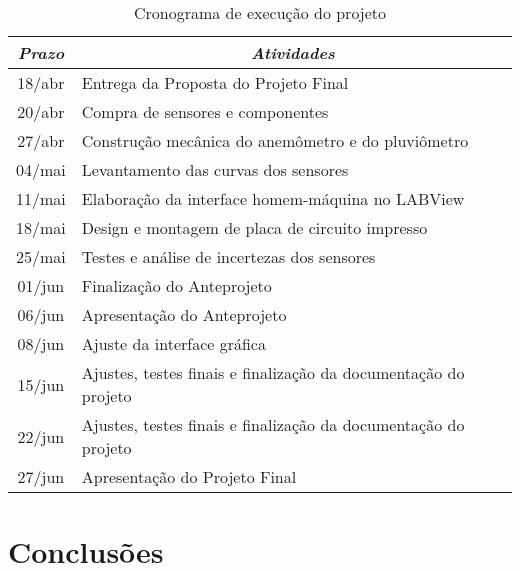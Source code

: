 \documentclass[12pt,a4paper]{instrumentacao}
\begin{document}
\begin{table}[H]
\centering
\caption{Cronograma de execução do projeto}
\label{tab:cronograma}
\begin{tabular}{|c|l|}
\hline
\textit{\textbf{Prazo}} & \multicolumn{1}{c|}{\textit{\textbf{Atividades}}}               \\ \hline
18/abr                  & Entrega da Proposta do Projeto Final                            \\ \hline
20/abr                  & Compra de sensores e componentes                                \\ \hline
27/abr                  & Construção mecânica do anemômetro e do pluviômetro              \\ \hline
04/mai                  & Levantamento das curvas dos sensores                            \\ \hline
11/mai                  & Elaboração da interface homem-máquina no LABView                \\ \hline
18/mai                  & Design e montagem de placa de circuito impresso                 \\ \hline
25/mai                  & Testes e análise de incertezas dos sensores                     \\ \hline
01/jun                  & Finalização do Anteprojeto                                      \\ \hline
06/jun                  & Apresentação do Anteprojeto                                     \\ \hline
08/jun                  & Ajuste da interface gráfica                                     \\ \hline
15/jun                  & Ajustes, testes finais e finalização da documentação do projeto \\ \hline
22/jun                  & Ajustes, testes finais e finalização da documentação do projeto \\ \hline
27/jun                  & Apresentação do Projeto Final                                   \\ \hline
\end{tabular}
\end{table}


\chapter{Conclusões}
\end{document}
